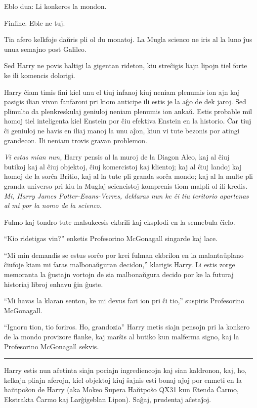 Eblo dua: Li konkeros la mondon.

Finfine. Eble ne tuj.

Tia afero kelkfoje daŭris pli ol du monatoj. La Mugla scienco ne iris al
la luno ĵus unua semajno post Galileo.

Sed Harry ne povis haltigi la gigentan rideton, kiu streĉigis liajn
lipojn tiel forte ke ili komencis dolorigi.

Harry ĉiam timis fini kiel unu el tiuj infanoj kiuj neniam plenumis
ion ajn kaj pasigis ilian vivon fanfaroni pri kiom anticipe ili estis je
la aĝo de dek jaroj. Sed plimulto da plenkreskulaj geniuloj neniam plenumis
ion ankaŭ. Estis probable mil homoj tiel inteligenta kiel Enstein por
ĉiu efektiva Enstein en la historio. Ĉar tiuj ĉi geniuloj ne havis en
iliaj manoj la unu aĵon, kiun vi tute bezonis por atingi
grandecon. Ili neniam trovis gravan problemon.

\emph{Vi estas mian nun,} Harry pensis al la muroj de la Diagon
Aleo, kaj al ĉiuj butikoj kaj al ĉiuj objektoj, ĉiuj komercistoj kaj
klientoj; kaj al ĉiuj landoj kaj homoj de la sorĉa Britio, kaj al la
tute pli granda sorĉa mondo; kaj al la multe pli granda universo pri
kiu la Muglaj sciencistoj komprenis tiom malpli ol ili
kredis. \emph{Mi, Harry James Potter-Evans-Verres, deklaras nun ke ĉi
tiu teritorio apartenas al mi por la nomo de la scienco.}

Fulmo kaj tondro tute malsukcesis ekbrili kaj eksplodi en la sennebula ĉielo.

``Kio ridetigas vin?'' enketis Profesorino McGonagall singarde kaj lace.

``Mi min demandis se estus sorĉo por krei fulman ekbrilon en la malantaŭplano
ĉiufoje kiam mi faras malbonaŭguran decidon,'' klarigis Harry. Li
estis zorge memoranta la ĝustajn vortojn de sia malbonaŭgura decido
por ke la futuraj historiaj libroj enhavu ĝin ĝuste.

``Mi havas la klaran senton, ke mi devus fari ion pri ĉi tio,''
suspiris Profesorino McGonagall.

``Ignoru tion, tio foriros. Ho, grandozia'' Harry metis siajn pensojn
pri la konkero de la mondo provizore flanke, kaj marŝis al butiko kun
malferma signo, kaj la Profesorino McGonagall sekvis.

\begin{center}\rule{3in}{0.4pt}\end{center}

Harry estis nun aĉetinta siajn pociajn ingrediencojn kaj sian
kaldronon, kaj, ho, kelkajn pliajn aferojn, kiel objektoj kiuj ŝajnis
esti bonaj aĵoj por enmeti en la haŭtpoŝon de Harry (aka Mokeo Supera
Haŭtpoŝo QX31 kun Etenda Ĉarmo, Ekstrakta Ĉarmo kaj Larĝigeblan
Lipon). Saĝaj, prudentaj aĉetaĵoj.

